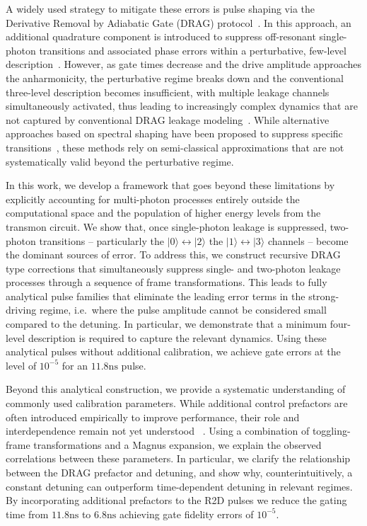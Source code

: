 \documentclass[superscriptaddress,amsmath,amssymb,aps,twocolumn,praplied,notitlepage]{revtex4-2}
\newcommand{\ket}[1]{\vert #1 \rangle}
\begin{document}
A widely used strategy to mitigate these errors is pulse shaping via the Derivative Removal by Adiabatic Gate (DRAG) protocol~\cite{motzoi2009simple,PhysRevA.88.062318,Theis2018Counteracting}. In this approach, an additional quadrature component is introduced to suppress off-resonant single-photon transitions and associated phase errors within a perturbative, few-level description~\cite{motzoi2009simple,PhysRevA.83.012308}. However, as gate times decrease and the drive amplitude approaches the anharmonicity, the perturbative regime breaks down and the conventional three-level description becomes insufficient, with multiple leakage channels simultaneously activated, thus leading to increasingly complex dynamics that are not captured by conventional DRAG leakage modeling~\cite{Li2024Experimental,li2024universal}. While alternative approaches based on spectral shaping have been proposed to suppress specific transitions~\cite{PRXQuantum.5.030353,Chiaro2025}, these methods rely on semi-classical approximations that are not systematically valid beyond the perturbative regime.

In this work, we develop a framework that goes beyond these limitations by explicitly accounting for multi-photon processes entirely outside the computational space and the population of higher energy levels from the transmon circuit. We show that, once single-photon leakage is suppressed, two-photon transitions -- particularly the $\ket{0}\leftrightarrow\ket{2}$ the $\ket{1}\leftrightarrow\ket{3}$ channels -- become the dominant sources of error. To address this, we construct recursive DRAG \cite{Li2024Experimental} type corrections that simultaneously suppress single- and two-photon leakage processes through a sequence of frame transformations. This leads to fully analytical pulse families that eliminate the leading error terms in the strong-driving regime, i.e.~where the pulse amplitude cannot be considered small compared to the detuning. In particular, we demonstrate that a minimum four-level description is required to capture the relevant dynamics. Using these analytical pulses without additional calibration, we achieve gate errors at the level of $10^{-5}$ for an $11.8 \mathrm{ns}$ pulse. 

Beyond this analytical construction, we provide a systematic understanding of commonly used calibration parameters. While additional control prefactors are often introduced empirically to improve performance, their role and interdependence remain not yet understood ~\cite{PhysRevLett.116.020501}. Using a combination of toggling-frame transformations and a Magnus expansion, we explain the observed correlations between these parameters. In particular, we clarify the relationship between the DRAG prefactor and detuning, and show why, counterintuitively, a constant detuning can outperform time-dependent detuning in relevant regimes. By incorporating additional prefactors to the R2D pulses we reduce the gating time from $11.8 \mathrm{ns}$ to $6.8 \mathrm{ns}$ achieving gate fidelity errors of \(10^{-5}\).
\end{document}
